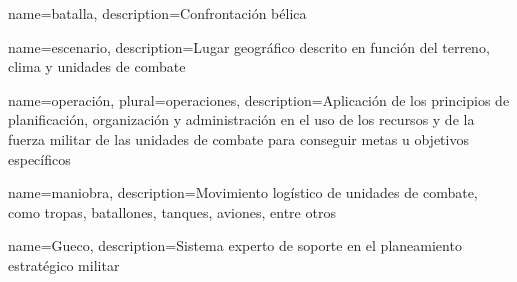 
 {
  name={batalla},
  description={Confrontación bélica}
}

 {
  name={escenario},
  description={Lugar geográfico descrito en función del terreno,
               clima y unidades de combate}
}

 {
  name={operación},
  plural={operaciones},
  description={Aplicación de los principios de planificación,
               organización y administración en el uso de los recursos
               y de la fuerza militar de las unidades de combate
               para conseguir metas u objetivos específicos}
}

 {
  name={maniobra},
  description={Movimiento logístico de unidades de combate, como tropas,
               batallones, tanques, aviones, entre otros}
}

 {
  name={Gueco},
  description={Sistema experto de soporte en el planeamiento estratégico militar}
}

